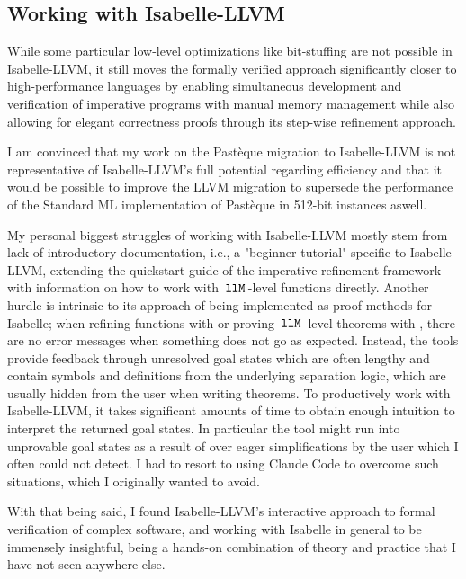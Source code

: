 \subsection{Working with Isabelle-LLVM}\label{sec:takeaways}
While some particular low-level optimizations like bit-stuffing are not possible in Isabelle-LLVM, it still moves the formally verified approach significantly closer to high-performance languages by enabling simultaneous development and verification of imperative programs with manual memory management while also allowing for elegant correctness proofs through its step-wise refinement approach.

I am convinced that my work on the Pastèque migration to Isabelle-LLVM is not representative of Isabelle-LLVM's full potential regarding efficiency and that it would be possible to improve the LLVM migration to supersede the performance of the Standard ML implementation of Pastèque in 512-bit instances aswell.

My personal biggest struggles of working with Isabelle-LLVM mostly stem from lack of introductory documentation, i.e., a "beginner tutorial" specific to Isabelle-LLVM, extending the quickstart guide of the imperative refinement framework \cite{Refine_Imperative_HOL-AFP} with information on how to work with $\,\text{\ttfamily llM}\,$-level functions directly.
Another hurdle is intrinsic to its approach of being implemented as proof methods for Isabelle; when refining functions with  or proving $\,\text{\ttfamily llM}\,$-level theorems with , there are no error messages when something does not go as expected.
Instead, the tools provide feedback through unresolved goal states which are often lengthy and contain symbols and definitions from the underlying separation logic, which are usually hidden from the user when writing theorems.
To productively work with Isabelle-LLVM, it takes significant amounts of time to obtain enough intuition to interpret the returned goal states.
In particular the  tool might run into unprovable goal states as a result of over eager simplifications by the user which I often could not detect.
I had to resort to using Claude Code to overcome such situations, which I originally wanted to avoid.

With that being said, I found Isabelle-LLVM's interactive approach to formal verification of complex software, and working with Isabelle in general to be immensely insightful, being a hands-on combination of theory and practice that I have not seen anywhere else.
